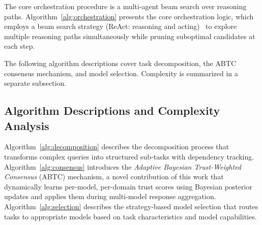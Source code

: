 \documentclass{iopjournal}
\newenvironment{algorithmic}[1][]{\begin{quote}\small}{\end{quote}}
\newcommand{\Require}{\textbf{Require:} }
\newcommand{\Ensure}{\textbf{Ensure:} }
\newcommand{\State}{\par\noindent}
\newcommand{\Comment}[1]{\hfill{\footnotesize(\textit{##1})}}
\newcommand{\For}[1]{\par\noindent\textbf{for} ##1 \textbf{do}}
\newcommand{\EndFor}{\par\noindent\textbf{end for}}
\newcommand{\If}[1]{\par\noindent\textbf{if} ##1 \textbf{then}}
\newcommand{\EndIf}{\par\noindent\textbf{end if}}
\newcommand{\Return}{\par\noindent\textbf{return} }
\begin{document}
The core orchestration procedure is a multi-agent beam search over reasoning paths. Algorithm~\ref{alg:orchestration} presents the core orchestration logic, which employs a beam search strategy (ReAct: reasoning and acting)~\cite{ReAct} to explore multiple reasoning paths simultaneously while pruning suboptimal candidates at each step.


The following algorithm descriptions cover task decomposition, the ABTC consensus mechanism, and model selection. Complexity is summarized in a separate subsection.

\subsection{Algorithm Descriptions and Complexity Analysis}

Algorithm~\ref{alg:decomposition} describes the decomposition process that transforms complex queries into structured sub-tasks with dependency tracking. Algorithm~\ref{alg:consensus} introduces the \emph{Adaptive Bayesian Trust-Weighted Consensus} (ABTC) mechanism, a novel contribution of this work that dynamically learns per-model, per-domain trust scores using Bayesian posterior updates and applies them during multi-model response aggregation. Algorithm~\ref{alg:selection} describes the strategy-based model selection that routes tasks to appropriate models based on task characteristics and model capabilities.
\end{document}
